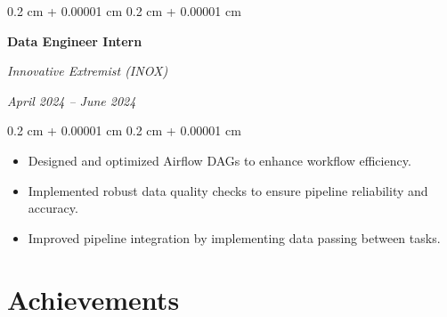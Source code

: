 \documentclass[8pt,letterpaper]{extarticle}
\newenvironment{highlights}{
    \begin{itemize}[
        topsep=0.10 cm,
        parsep=0.10 cm,
        partopsep=0pt,
        itemsep=0pt,
        leftmargin=0.4 cm + 10pt
    ]
}{
    \end{itemize}
} %
\newenvironment{onecolentry}{
    \begin{adjustwidth}{
        0.2 cm + 0.00001 cm
    }{
        0.2 cm + 0.00001 cm
    }
}{
    \end{adjustwidth}
} %
\newenvironment{twocolentry}[2][]{
    \onecolentry
    \def\secondColumn{#2}
    \setcolumnwidth{\fill, 5.0 cm}
    \begin{paracol}{2}
}{
    \switchcolumn \raggedleft \secondColumn
    \end{paracol}
    \endonecolentry
} %
\begin{document}
        \begin{twocolentry}{
            \textit{April 2024 – June 2024}}
            \textbf{Data Engineer Intern}

            \textit{Innovative Extremist (INOX)}
        \end{twocolentry}

        \vspace{0.10 cm}
        \begin{onecolentry}
            \begin{highlights}
                \item Designed and optimized Airflow DAGs to enhance workflow efficiency.
                \item Implemented robust data quality checks to ensure pipeline reliability and accuracy.
                \item Improved pipeline integration by implementing data passing between tasks.
            \end{highlights}
        \end{onecolentry}

    \section{Achievements}
\end{document}
